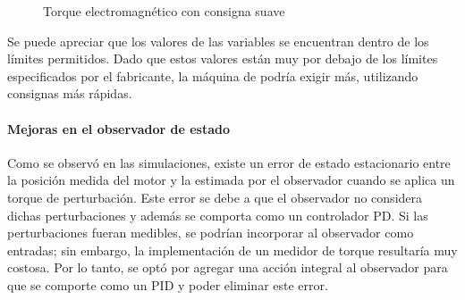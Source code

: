 \documentclass[a4paper, 10pt, onecolumn,journal]{ieeeconf}
\begin{document}
\begin{figure}[H]
	\centering
	\begin{adjustbox}{max width=\columnwidth}
	\end{adjustbox}
	\caption{Torque electromagnético con consigna suave}
	\label{Torque electromagnético con consigna suave}
\end{figure}
Se puede apreciar que los valores de las variables se encuentran dentro de los límites permitidos. Dado que estos valores están muy por debajo de los límites especificados por el fabricante, la máquina de podría exigir más, utilizando consignas más rápidas.
\paragraph{\textbf{Mejoras en el observador de estado}} 
Como se observó en las simulaciones, existe un error de estado estacionario entre la posición medida del motor y la estimada por el observador cuando se aplica un torque de perturbación. Este error se debe a que el observador no considera dichas perturbaciones y además se comporta como un controlador PD. Si las perturbaciones fueran medibles, se podrían incorporar al observador como entradas; sin embargo, la implementación de un medidor de torque resultaría muy costosa. Por lo tanto, se optó por agregar una acción integral al observador para que se comporte como un PID y poder eliminar este error.
\end{document}
